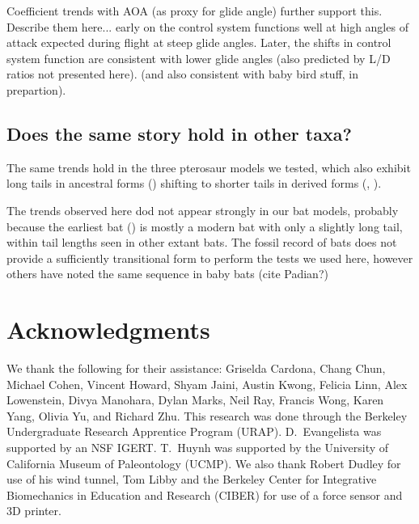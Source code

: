 Coefficient trends with AOA (as proxy for glide angle) further support this.  Describe them here... early on the control system functions well at high angles of attack expected during flight at steep glide angles.  Later, the shifts in control system function are consistent with lower glide angles (also predicted by L/D ratios not presented here).  (and also consistent with baby bird stuff, in prepartion).

\subsection{Does the same story hold in other taxa?}
The same trends hold in the three pterosaur models we tested, which also exhibit long tails in ancestral forms (\Rhamphorynchus) shifting to shorter tails in derived forms (\Pteranodon, \Pterodactylus).  

The trends observed here dod not appear strongly in our bat models, probably because the earliest bat (\Onychonycteris) is mostly a modern bat with only a slightly long tail, within tail lengths seen in other extant bats.  The fossil record of bats does not provide a sufficiently transitional form to perform the tests we used here, however others have noted the same sequence in baby bats (cite Padian?)
































\section{Acknowledgments}
We thank the following for their assistance: Griselda Cardona, Chang Chun, Michael Cohen, Vincent Howard, Shyam Jaini, Austin Kwong, Felicia Linn, Alex Lowenstein, Divya Manohara, Dylan Marks, Neil Ray, Francis Wong, Karen Yang, Olivia Yu, and Richard Zhu. This research was done through the Berkeley Undergraduate Research Apprentice Program (URAP).  D.\ Evangelista was supported by an NSF IGERT. T.\ Huynh was supported by the University of California Museum of Paleontology (UCMP).  We also thank Robert Dudley for use of his wind tunnel, Tom Libby and the Berkeley Center for Integrative Biomechanics in Education and Research (CIBER) for use of a force sensor and 3D printer.



%


